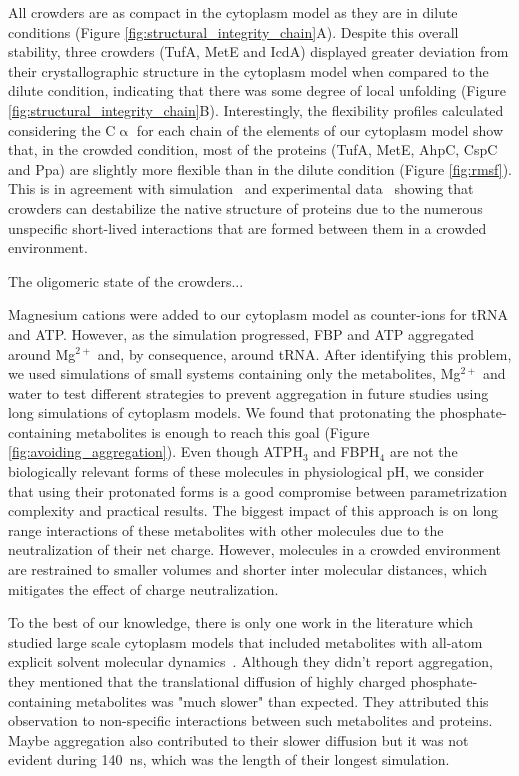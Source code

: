 \documentclass[journal=jacsat,manuscript=article]{achemso}
\begin{document}
All crowders are as compact in the cytoplasm model as they are in dilute conditions (Figure \ref{fig:structural_integrity_chain}A). Despite this overall stability, three crowders (TufA, MetE and IcdA) displayed greater deviation from their crystallographic structure in the cytoplasm model when compared to the dilute condition, indicating that there was some degree of local unfolding (Figure \ref{fig:structural_integrity_chain}B). Interestingly, the flexibility profiles calculated considering the C$\upalpha$ for each chain of the elements of our cytoplasm model show that, in the crowded condition, most of the proteins (TufA, MetE, AhpC, CspC and Ppa) are slightly more flexible than in the dilute condition (Figure \ref{fig:rmsf}). This is in agreement with simulation~\cite{feig2011variable} and experimental data~\cite{miklos2011protein,wang2012macromolecular} showing that crowders can destabilize the native structure of proteins due to the numerous unspecific short-lived interactions that are formed between them in a crowded environment.

The oligomeric state of the crowders... \textbf{\color{red}{MISSING RESULTS: whole crowder structural integrity using buried oligomer area}}


Magnesium cations were added to our cytoplasm model as counter-ions for tRNA and ATP. However, as the simulation progressed, FBP and ATP aggregated around Mg$^{2+}$ and, by consequence, around tRNA. After identifying this problem, we used simulations of small systems containing only the metabolites, Mg$^{2+}$ and water to test different strategies to prevent aggregation in future studies using long simulations of cytoplasm models. We found that protonating the phosphate-containing metabolites is enough to reach this goal (Figure \ref{fig:avoiding_aggregation}). Even though ATPH$_3$ and FBPH$_4$ are not the biologically relevant forms of these molecules in physiological pH, we consider that using their protonated forms is a good compromise between parametrization complexity and practical results. The biggest impact of this approach is on long range interactions of these metabolites with other molecules due to the neutralization of their net charge. However, molecules in a crowded environment are restrained to smaller volumes and shorter inter molecular distances, which mitigates the effect of charge neutralization.

To the best of our knowledge, there is only one work in the literature which studied large scale cytoplasm models that included metabolites with all-atom explicit solvent molecular dynamics~\cite{Yu2016a}. Although they didn't report aggregation, they mentioned that the translational diffusion of highly charged phosphate-containing metabolites was "much slower" than expected. They attributed this observation to non-specific interactions between such metabolites and proteins. Maybe aggregation also contributed to their slower diffusion but it was not evident during \SI{140}{\nano\second}, which was the length of their longest simulation.
\end{document}
